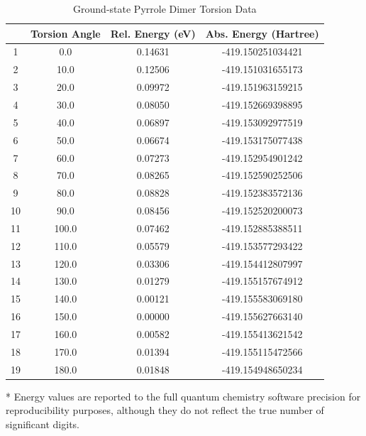 \begin{table}[hbt!]\centering
\caption{Ground-state Pyrrole Dimer Torsion Data}
\renewcommand{\arraystretch}{1.5}
\begin{threeparttable}
\begin{tabular}{cccc}\toprule
  {} & {Torsion Angle} & {Rel. Energy (eV)} & {Abs. Energy (Hartree)} \\ \midrule
    1  & 0.0   & 0.14631 & -419.150251034421\\
    2  & 10.0  & 0.12506 & -419.151031655173\\
    3  & 20.0  & 0.09972 & -419.151963159215\\
    4  & 30.0  & 0.08050 & -419.152669398895\\
    5  & 40.0  & 0.06897 & -419.153092977519\\
    6  & 50.0  & 0.06674 & -419.153175077438\\
    7  & 60.0  & 0.07273 & -419.152954901242\\
    8  & 70.0  & 0.08265 & -419.152590252506\\
    9  & 80.0  & 0.08828 & -419.152383572136\\
    10 & 90.0  & 0.08456 & -419.152520200073\\
    11 & 100.0 & 0.07462 & -419.152885388511\\
    12 & 110.0 & 0.05579 & -419.153577293422\\
    13 & 120.0 & 0.03306 & -419.154412807997\\
    14 & 130.0 & 0.01279 & -419.155157674912\\
    15 & 140.0 & 0.00121 & -419.155583069180\\
    16 & 150.0 & 0.00000 & -419.155627663140\\
    17 & 160.0 & 0.00582 & -419.155413621542\\
    18 & 170.0 & 0.01394 & -419.155115472566\\
    19 & 180.0 & 0.01848 & -419.154948650234\\ \bottomrule
\end{tabular}
\begin{tablenotes}
\item[*] \footnotesize Energy values are reported to the full quantum chemistry software precision for reproducibility purposes, although they do not reflect the true number of significant digits.
\end{tablenotes}
\end{threeparttable}
\end{table}


